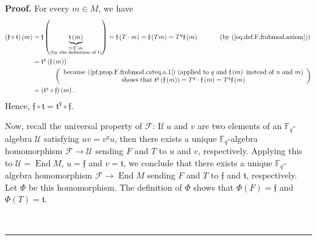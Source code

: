\documentclass[numbers=enddot,12pt,final,onecolumn,notitlepage]{scrartcl}%
\theoremstyle{definition}
\newenvironment{proof}[1][Proof]{\noindent\textbf{#1.} }{\ \rule{0.5em}{0.5em}}
\begin{document}
\begin{proof}
For every $m\in M$, we have%
\begin{align*}
\left(  \mathfrak{f}\circ\mathfrak{t}\right)  \left(  m\right)   &
=\mathfrak{f}\left(  \underbrace{\mathfrak{t}\left(  m\right)  }%
_{\substack{=T\cdot m\\\text{(by the definition of }\mathfrak{t}\text{)}%
}}\right)  =\mathfrak{f}\left(  T\cdot m\right)  =\mathfrak{f}\left(
Tm\right)  =T^{q}\mathfrak{f}\left(  m\right)  \ \ \ \ \ \ \ \ \ \ \left(
\text{by (\ref{eq.def.F.frobmod.axiom})}\right) \\
&  =\mathfrak{t}^{q}\left(  \mathfrak{f}\left(  m\right)  \right) \\
&  \ \ \ \ \ \ \ \ \ \ \left(
\begin{array}
[c]{c}%
\text{because (\ref{pf.prop.F.frobmod.cateq.a.1}) (applied to }q\text{ and
}\mathfrak{f}\left(  m\right)  \text{ instead of }n\text{ and }m\text{)}\\
\text{shows that }\mathfrak{t}^{q}\left(  \mathfrak{f}\left(  m\right)
\right)  =T^{q}\cdot\mathfrak{f}\left(  m\right)  =T^{q}\mathfrak{f}\left(
m\right)
\end{array}
\right) \\
&  =\left(  \mathfrak{t}^{q}\circ\mathfrak{f}\right)  \left(  m\right)  .
\end{align*}
Hence, $\mathfrak{f}\circ\mathfrak{t}=\mathfrak{t}^{q}\circ\mathfrak{f}$.

Now, recall the universal property of $\mathcal{F}$: If $u$ and $v$ are two
elements of an $\mathbb{F}_{q}$-algebra $\mathcal{U}$ satisfying $uv=v^{q}u$,
then there exists a unique $\mathbb{F}_{q}$-algebra homomorphism
$\mathcal{F}\rightarrow\mathcal{U}$ sending $F$ and $T$ to $u$ and $v$,
respectively. Applying this to $\mathcal{U}=\operatorname*{End}M$,
$u=\mathfrak{f}$ and $v=\mathfrak{t}$, we conclude that there exists a unique
$\mathbb{F}_{q}$-algebra homomorphism $\mathcal{F}\rightarrow
\operatorname*{End}M$ sending $F$ and $T$ to $\mathfrak{f}$ and $\mathfrak{t}%
$, respectively. Let $\Phi$ be this homomorphism. The definition of $\Phi$
shows that $\Phi\left(  F\right)  =\mathfrak{f}$ and $\Phi\left(  T\right)
=\mathfrak{t}$.


\end{proof}
\end{document}

